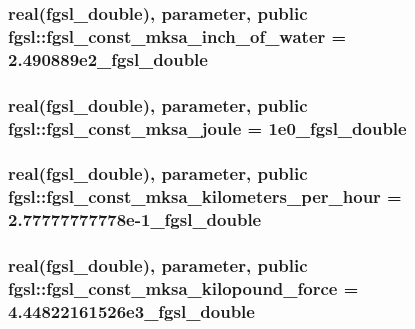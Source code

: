 \subsubsection[{fgsl\+\_\+const\+\_\+mksa\+\_\+inch\+\_\+of\+\_\+water}]{\setlength{\rightskip}{0pt plus 5cm}real({\bf fgsl\+\_\+double}), parameter, public fgsl\+::fgsl\+\_\+const\+\_\+mksa\+\_\+inch\+\_\+of\+\_\+water = 2.\+490889e2\+\_\+fgsl\+\_\+double}\label{namespacefgsl_afdebd41de62af9d5a4b9ed6efcf9cea2}
\hypertarget{namespacefgsl_a2bb10acb778e8412e7c0bc7e7f95787b}{}
\subsubsection[{fgsl\+\_\+const\+\_\+mksa\+\_\+joule}]{\setlength{\rightskip}{0pt plus 5cm}real({\bf fgsl\+\_\+double}), parameter, public fgsl\+::fgsl\+\_\+const\+\_\+mksa\+\_\+joule = 1e0\+\_\+fgsl\+\_\+double}\label{namespacefgsl_a2bb10acb778e8412e7c0bc7e7f95787b}
\hypertarget{namespacefgsl_ae0c1239a6941272700558b0eaf053137}{}
\subsubsection[{fgsl\+\_\+const\+\_\+mksa\+\_\+kilometers\+\_\+per\+\_\+hour}]{\setlength{\rightskip}{0pt plus 5cm}real({\bf fgsl\+\_\+double}), parameter, public fgsl\+::fgsl\+\_\+const\+\_\+mksa\+\_\+kilometers\+\_\+per\+\_\+hour = 2.\+77777777778e-\/1\+\_\+fgsl\+\_\+double}\label{namespacefgsl_ae0c1239a6941272700558b0eaf053137}
\hypertarget{namespacefgsl_a7c76b512b50dc8300612e051816e5ede}{}
\subsubsection[{fgsl\+\_\+const\+\_\+mksa\+\_\+kilopound\+\_\+force}]{\setlength{\rightskip}{0pt plus 5cm}real({\bf fgsl\+\_\+double}), parameter, public fgsl\+::fgsl\+\_\+const\+\_\+mksa\+\_\+kilopound\+\_\+force = 4.\+44822161526e3\+\_\+fgsl\+\_\+double}\label{namespacefgsl_a7c76b512b50dc8300612e051816e5ede}
\hypertarget{namespacefgsl_a36e83219d4dc03eaba28ee2ee6636c56}{}
